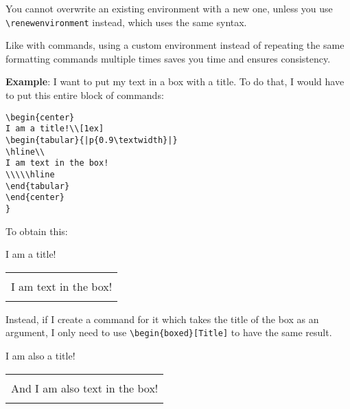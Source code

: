 \documentclass[12pt, letterpaper]{article} %
\newenvironment{boxed}[1]
	{\begin{center}
		#1\\[1ex]
		\begin{tabular}{|p{0.9\textwidth}|}
			\hline\\
		}
		{ 
			\\\\\hline
		\end{tabular} 
	\end{center}
}
\begin{document}
You cannot overwrite an existing environment with a new one, unless you use
\verb+\renewenvironment+ instead, which uses the same syntax.

Like with commands, using a custom environment instead of repeating the same
formatting commands multiple times saves you time and ensures consistency.

\textbf{Example}: I want to put my text in a box with a title. To do that, I
would have to put this entire block of commands:

\begin{verbatim}
\begin{center}
I am a title!\\[1ex]
\begin{tabular}{|p{0.9\textwidth}|}
\hline\\
I am text in the box!
\\\\\hline
\end{tabular} 
\end{center}
}
\end{verbatim}

To obtain this:

\begin{center}
	I am a title!\\[1ex]
	\begin{tabular}{|p{}|}
		\hline\\
		I am text in the box!
		\\\\\hline
	\end{tabular} 
\end{center}


Instead, if I create a command for it which takes the title of the box as an
argument, I only need to use \verb+\begin{boxed}[Title]+ to have the same 
result.

\begin{boxed}{I am also a title!}
	And I am also text in the box!
\end{boxed}
\end{document}

